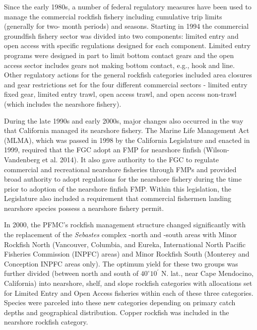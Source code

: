 \documentclass[11pt,
  english,
  letterpaper,
]{article}
\begin{document}
Since the early 1980s, a number of federal regulatory measures have been used to manage the commercial rockfish fishery including cumulative trip limits (generally for two- month periods) and seasons. Starting in 1994 the commercial groundfish fishery sector was divided into two components: limited entry and open access with specific regulations designed for each component. Limited entry programs were designed in part to limit bottom contact gears and the open access sector includes gears not making bottom contact, e.g., hook and line. Other regulatory actions for the general rockfish categories included area closures and gear restrictions set for the four different commercial sectors - limited entry fixed gear, limited entry trawl, open access trawl, and open access non-trawl (which includes the nearshore fishery).

During the late 1990s and early 2000s, major changes also occurred in the way that California managed its nearshore fishery. The Marine Life Management Act (MLMA), which was passed in 1998 by the California Legislature and enacted in 1999, required that the FGC adopt an FMP for nearshore finfish (Wilson-Vandenberg et al. 2014). It also gave authority to the FGC to regulate commercial and recreational nearshore fisheries through FMPs and provided broad authority to adopt regulations for the nearshore fishery during the time prior to adoption of the nearshore finfish FMP. Within this legislation, the Legislature also included a requirement that commercial fishermen landing nearshore species possess a nearshore fishery permit.

In 2000, the PFMC's rockfish management structure changed significantly with the replacement of the \emph{Sebastes} complex -north and -south areas with Minor Rockfish North (Vancouver, Columbia, and Eureka, International North Pacific Fisheries Commission (INPFC) areas) and Minor Rockfish South (Monterey and Conception INPFC areas only). The optimum yield for these two groups was further divided (between north and south of $40^\circ 10^\prime$ N. lat., near Cape Mendocino, California) into nearshore, shelf, and slope rockfish categories with allocations set for Limited Entry and Open Access fisheries within each of these three categories. Species were parceled into these new categories depending on primary catch depths and geographical distribution. Copper rockfish was included in the nearshore rockfish category.
\end{document}
